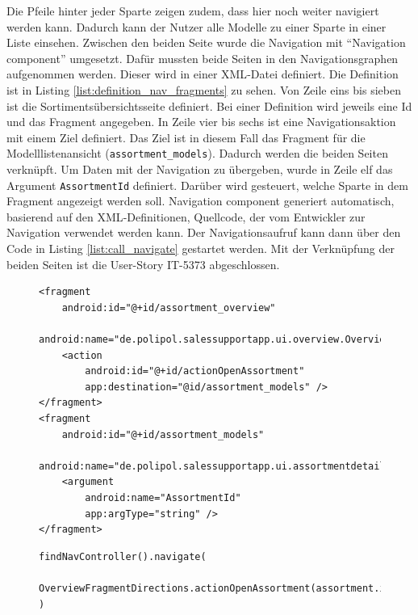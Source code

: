 Die Pfeile hinter jeder Sparte zeigen zudem, dass hier noch weiter navigiert werden kann. Dadurch kann der Nutzer alle Modelle zu einer Sparte in einer Liste einsehen. Zwischen den beiden Seite wurde die Navigation mit \enquote{Navigation component} umgesetzt. Dafür mussten beide Seiten in den Navigationsgraphen aufgenommen werden. Dieser wird in einer \gls{XML}-Datei definiert. Die Definition ist in Listing \ref{list:definition_nav_fragments} zu sehen. Von Zeile eins bis sieben ist die Sortimentsübersichtsseite definiert. Bei einer Definition wird jeweils eine Id und das Fragment angegeben. In Zeile vier bis sechs ist eine Navigationsaktion mit einem Ziel definiert. Das Ziel ist in diesem Fall das Fragment für die Modelllistenansicht (\texttt{assortment\_models}). Dadurch werden die beiden Seiten verknüpft. Um Daten mit der Navigation zu übergeben, wurde in Zeile elf das Argument \texttt{AssortmentId} definiert. Darüber wird gesteuert, welche Sparte in dem Fragment angezeigt werden soll. Navigation component generiert automatisch, basierend auf den \gls{XML}-Definitionen, Quellcode, der vom Entwickler zur Navigation verwendet werden kann. Der Navigationsaufruf kann dann über den Code in Listing \ref{list:call_navigate} gestartet werden. Mit der Verknüpfung der beiden Seiten ist die User-Story IT-5373 abgeschlossen.

\begin{figure}[!htb]
    \begin{lstlisting}[caption=Definition der Fragmente für Navigation component, label=list:definition_nav_fragments]
<fragment
    android:id="@+id/assortment_overview"
    android:name="de.polipol.salessupportapp.ui.overview.OverviewFragment">
    <action
        android:id="@+id/actionOpenAssortment"
        app:destination="@id/assortment_models" />
</fragment>
<fragment
    android:id="@+id/assortment_models"
    android:name="de.polipol.salessupportapp.ui.assortmentdetail.AssortmentDetailFragment">
    <argument
        android:name="AssortmentId"
        app:argType="string" />
</fragment>
    \end{lstlisting}
\end{figure}

\begin{figure}[!htb]
    \begin{lstlisting}[caption=Aufruf der Navigation, label=list:call_navigate]
findNavController().navigate(
    OverviewFragmentDirections.actionOpenAssortment(assortment.id)
)
    \end{lstlisting}
\end{figure}

